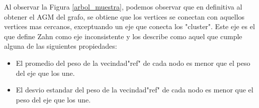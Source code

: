 Al observar la Figura \ref{arbol_muestra}, podemos observar que en definitiva al obtener el AGM del grafo, se obtiene que los vertices se conectan con aquellos vertices mas cercanos, exceptuando un eje que conecta los "cluster". Este eje es el que define Zahn como eje inconsistente y los describe como aquel que cumple alguna de las siguientes propiedades:

\begin{itemize}
    \item El promedio del peso de la vecindad"ref" de cada nodo es menor que el peso del eje que los une.
    \item El desvio estandar del peso de la vecindad"ref" de cada nodo es menor que el peso del eje que los une.
\end{itemize}

    
